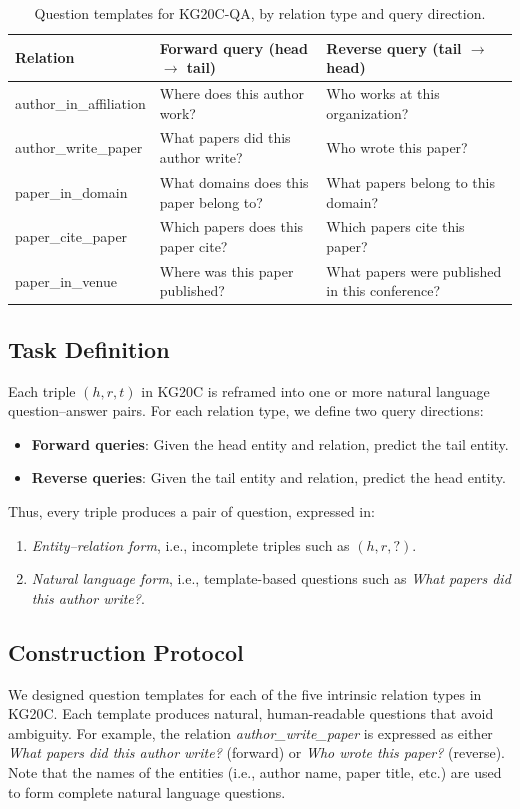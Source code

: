 \documentclass[conference]{IEEEtran}
\begin{document}
\begin{table}[ht]
	\small
	\centering
	\caption{Question templates for KG20C-QA, by relation type and query direction.}
	\label{tab:qa_templates}
	\begin{tabular}{p{3cm}p{5.5cm}p{6.5cm}}
		\toprule
		\textbf{Relation} & \textbf{Forward query (head $\to$ tail)} & \textbf{Reverse query (tail $\to$ head)} \\
		\hline
		author\_in\_affiliation & Where does this author work? & Who works at this organization? \\
		author\_write\_paper & What papers did this author write? & Who wrote this paper? \\
		paper\_in\_domain & What domains does this paper belong to? & What papers belong to this domain? \\
		paper\_cite\_paper & Which papers does this paper cite? & Which papers cite this paper? \\
		paper\_in\_venue & Where was this paper published? & What papers were published in this conference? \\
		\bottomrule
	\end{tabular}
\end{table}

\subsection{Task Definition}
Each triple $(h, r, t)$ in KG20C is reframed into one or more natural language question--answer pairs. For each relation type, we define two query directions:
\begin{itemize}
	\item \textbf{Forward queries}: Given the head entity and relation, predict the tail entity. 
	\item \textbf{Reverse queries}: Given the tail entity and relation, predict the head entity.
\end{itemize}
Thus, every triple produces a pair of question, expressed in:
\begin{enumerate}
	\item \textit{Entity--relation form}, i.e., incomplete triples such as $(h, r, ?)$.
	\item \textit{Natural language form}, i.e., template-based questions such as \textit{What papers did this author write?}.
\end{enumerate}

\subsection{Construction Protocol}
We designed question templates for each of the five intrinsic relation types in KG20C. Each template produces natural, human-readable questions that avoid ambiguity. For example, the relation \textit{author\_write\_paper} is expressed as either \textit{What papers did this author write?} (forward) or \textit{Who wrote this paper?} (reverse). Note that the names of the entities (i.e., author name, paper title, etc.) are used to form complete natural language questions.
\end{document}
